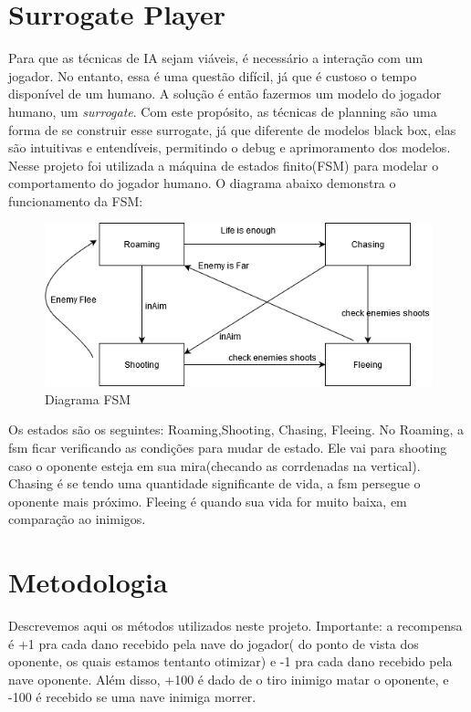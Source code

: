 \documentclass[]{book}
\begin{document}
\chapter{Surrogate Player}\label{surrogate-player}

Para que as técnicas de IA sejam viáveis, é necessário a interação com
um jogador. No entanto, essa é uma questão difícil, já que é custoso o
tempo disponível de um humano. A solução é então fazermos um modelo do
jogador humano, um \emph{surrogate}. Com este propósito, as técnicas de
planning são uma forma de se construir esse surrogate, já que diferente
de modelos black box, elas são intuitivas e entendíveis, permitindo o
debug e aprimoramento dos modelos. Nesse projeto foi utilizada a máquina
de estados finito(FSM) para modelar o comportamento do jogador humano. O
diagrama abaixo demonstra o funcionamento da FSM:

\begin{figure}

{\centering \includegraphics[width=0.5\linewidth]{content/imgs/FSM} 

}

\caption{Diagrama FSM}\label{fig:fsm}
\end{figure}

Os estados são os seguintes: Roaming,Shooting, Chasing, Fleeing. No
Roaming, a fsm ficar verificando as condições para mudar de estado. Ele
vai para shooting caso o oponente esteja em sua mira(checando as
corrdenadas na vertical). Chasing é se tendo uma quantidade significante
de vida, a fsm persegue o oponente mais próximo. Fleeing é quando sua
vida for muito baixa, em comparação ao inimigos.

\chapter{Metodologia}\label{methods}

Descrevemos aqui os métodos utilizados neste projeto. Importante: a
recompensa é +1 pra cada dano recebido pela nave do jogador( do ponto de
vista dos oponente, os quais estamos tentanto otimizar) e -1 pra cada
dano recebido pela nave oponente. Além disso, +100 é dado de o tiro
inimigo matar o oponente, e -100 é recebido se uma nave inimiga morrer.
\end{document}

